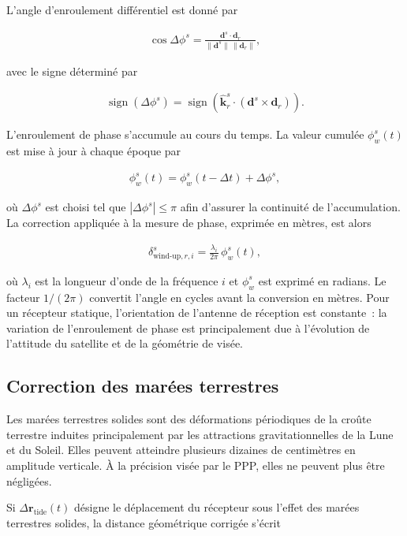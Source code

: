 L'angle d'enroulement différentiel est donné par

\begin{align}
\cos\Delta\phi^s
=
\frac{\mathbf d^s\cdot\mathbf d_r}
{\|\mathbf d^s\|\,\|\mathbf d_r\|},
\end{align}

avec le signe déterminé par

\begin{align}
\operatorname{sign}(\Delta\phi^s)
=
\operatorname{sign}\!\left(
\hat{\mathbf k}_r^s\cdot(\mathbf d^s\times\mathbf d_r)
\right).
\end{align}

L'enroulement de phase s'accumule au cours du temps. La valeur cumulée $\phi_w^s(t)$ est mise à jour à chaque époque par

\begin{align}
\phi_w^s(t)
=
\phi_w^s(t-\Delta t)
+
\Delta\phi^s,
\end{align}

où $\Delta\phi^s$ est choisi tel que $|\Delta\phi^s|\leq\pi$ afin d'assurer la continuité de l'accumulation. La correction appliquée à la mesure de phase, exprimée en mètres, est alors

\begin{align}
\delta_{\mathrm{wind\text{-}up},r,i}^s
=
\frac{\lambda_i}{2\pi}\,\phi_w^s(t),
\label{eq:windup}
\end{align}

où $\lambda_i$ est la longueur d'onde de la fréquence $i$ et $\phi_w^s$ est
exprimé en radians. Le facteur $1/(2\pi)$ convertit l'angle en cycles avant la
conversion en mètres. Pour un récepteur statique, l'orientation de l'antenne
de réception est constante~: la variation de l'enroulement de phase est
principalement due à l'évolution de l'attitude du satellite et de la géométrie
de visée.

\subsection{Correction des marées terrestres}\label{marees}

Les marées terrestres solides sont des déformations périodiques de la croûte
terrestre induites principalement par les attractions gravitationnelles de la
Lune et du Soleil. Elles peuvent atteindre plusieurs dizaines de centimètres
en amplitude verticale. À la précision visée par le PPP, elles ne peuvent plus
être négligées.

Si $\Delta\mathbf r_{\mathrm{tide}}(t)$ désigne le déplacement du récepteur
sous l'effet des marées terrestres solides, la distance géométrique corrigée
s'écrit

